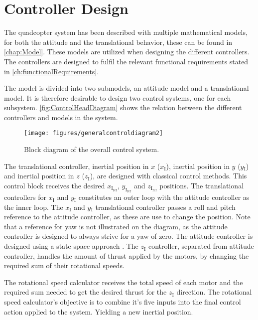 \chapter{Controller Design}\label{chap:Control}
The quadcopter system has been described with multiple mathematical models, for both the attitude and the translational behavior, these can be found in \autoref{chap:Model}. These models are utilized when designing the different controllers. The controllers are designed to fulfil the relevant functional requirements stated in \autoref{ch:functionalRequirements}.

The model is divided into two submodels, an attitude model and a translational model. It is therefore desirable to design two control systems, one for each subsystem. \autoref{fig:ControlHeadDiagram} shows the relation between the different controllers and models in the system.

%
\begin{figure}[H]
	\centering
	\texttt{[image: figures/generalcontroldiagram2]}
	\caption{Block diagram of the overall control system.}
	\label{fig:ControlHeadDiagram}
\end{figure}
%
The translational controller, inertial position in $x$ ($x\mathrm{_I}$), inertial position in $y$ ($y\mathrm{_I}$) and inertial position in $z$ ($z\mathrm{_I}$), are designed with classical control methods. This control block receives the desired $x_\mathrm{I_{ref}}$, $y_\mathrm{I_{ref}}$ and $z_\mathrm{I_{ref}}$ positions. The translational controllers for $x\mathrm{_I}$ and $y\mathrm{_I}$ constitutes an outer loop with the attitude controller as the inner loop. The $x\mathrm{_I}$ and $y\mathrm{_I}$ translational controller passes a roll and pitch reference to the attitude controller, as these are use to change the position. Note that a reference for yaw is not illustrated on the diagram, as the attitude controller is designed to always strive for a yaw of zero. The attitude controller is designed using a state space approach \cite{ssReference}. The $z\mathrm{_I}$ controller, separated from attitude controller, handles the amount of thrust applied by the motors, by changing the required sum of their rotational speeds.

The rotational speed calculator receives the total speed of each motor and the required sum needed to get the desired thrust for the $z\mathrm{_I}$ direction. The rotational speed calculator's objective is to combine it's five inputs into the final control action applied to the system. Yielding a new inertial position.

